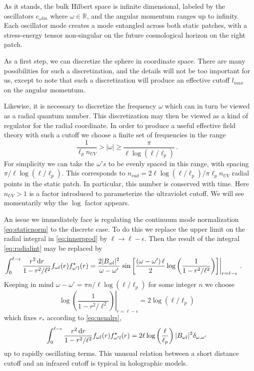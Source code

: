 \documentclass{brownthesis}
\def\dd{{\rm d}}
\begin{document}
As it stands, the bulk Hilbert space is infinite dimensional, labeled
by the oscillators $c_{\omega lm}$ where $\omega\in\mathbb{R}$,
and the angular momentum ranges up to infinity. Each oscillator mode
creates a mode entangled across both static patches, with a stress-energy
tensor non-singular on the future cosmological horizon on the right
patch.

As a first step, we can discretize the sphere in coordinate space.
There are many possibilities for such a discretization, and the details
will not be too important for us, except to note that such a discretization
will produce an effective cutoff $l_{max}$ on the angular momentum.

Likewise, it is necessary to discretize the frequency $\omega$ which
can in turn be viewed as a radial quantum number. This discretization
may then be viewed as a kind of regulator for the radial coordinate.
In order to produce a useful effective field theory with such a cutoff
we choose a finite set of frequencies in the range
\begin{equation}
\frac{1}{\ell_{p}n_{UV}}>|\omega|\geq\frac{\pi}{\ell\log\left(\ell/\ell_{p}\right)}\,.\label{eq:iruv}
\end{equation}
For simplicity we can take the $\omega's$ to be evenly spaced in
this range, with spacing $\pi/\ell\log\left(\ell/\ell_{p}\right)$.
This corresponds to $n_{rad}=2\ell\log(\ell/\ell_{p})/\pi\ell_{p}n_{UV}$
radial points in the static patch. In particular, this number is conserved
with time. Here $n_{UV}>1$ is a factor introduced to parameterize
the ultraviolet cutoff. We will see momentarily why the $\log$ factor
appears.

An issue we immediately face is regulating the continuum mode normalization
\eqref{eq:staticnorm} to the discrete case. To do this we replace
the upper limit on the radial integral in \eqref{eq:innerprod} by
$\ell\to\ell-\epsilon.$ Then the result of the integral \eqref{eq:radialint}
may be replaced by
\begin{align*}
\int_{0}^{\ell-\epsilon}\frac{r^{2}\,\dd r}{1-r^{2}/\ell^{2}}f_{\omega l}(r)f_{\omega'l}^{\star}(r) & =\frac{2|B_{\omega l}|^{2}}{\omega-\omega'}\left.\sin\left[\frac{\left(\omega-\omega'\right)\ell}{2}\log\left(\frac{1}{1-r^{2}/\ell^{2}}\right)\right]\right|_{r=\ell-\epsilon}\,.
\end{align*}
Keeping in mind $\omega-\omega'=\pi n/\ell\log\left(\ell/\ell_{p}\right)$
for some integer $n$ we choose
\begin{equation}
\left.\log\left(\frac{1}{1-r^{2}/\ell^{2}}\right)\right|_{r=\ell-\epsilon}=2\log\left(\ell/\ell_{p}\right)\label{eq:horpos}
\end{equation}
which fixes $r_{*}$ according to \eqref{eq:usualrs},
\[
\int_{0}^{\ell-\epsilon}\frac{r^{2}\,\dd r}{1-r^{2}/\ell^{2}}f_{\omega l}(r)f_{\omega'l}^{\star}(r)=2\ell\log\left(\frac{\ell}{\ell_{p}}\right)|B_{\omega l}|^{2}\delta_{\omega,\omega'}
\]
up to rapidly oscillating terms. This unusual relation between a short
distance cutoff and an infrared cutoff is typical in holographic models.
\end{document}
